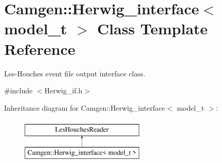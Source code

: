 \hypertarget{a00279}{\section{Camgen\-:\-:Herwig\-\_\-interface$<$ model\-\_\-t $>$ Class Template Reference}
\label{a00279}
}


Les-\/\-Houches event file output interface class.  




{\ttfamily \#include $<$Herwig\-\_\-if.\-h$>$}

Inheritance diagram for Camgen\-:\-:Herwig\-\_\-interface$<$ model\-\_\-t $>$\-:\begin{figure}[H]
\begin{center}
\leavevmode
\includegraphics[height=2.000000cm]{a00279}
\end{center}
\end{figure}
